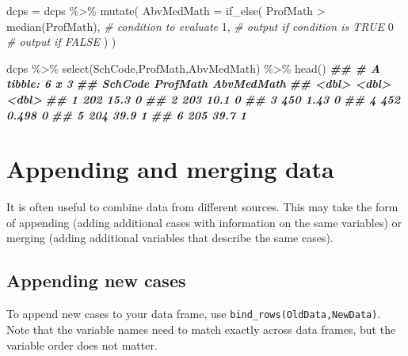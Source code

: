 \documentclass[
  12pt,
]{krantz}
\newenvironment{Shaded}{\begin{snugshade}}{\end{snugshade}}
\newcommand{\AttributeTok}[1]{\textcolor[rgb]{0.77,0.63,0.00}{#1}}
\newcommand{\CommentTok}[1]{\textcolor[rgb]{0.56,0.35,0.01}{\textit{#1}}}
\newcommand{\DecValTok}[1]{\textcolor[rgb]{0.00,0.00,0.81}{#1}}
\newcommand{\DocumentationTok}[1]{\textcolor[rgb]{0.56,0.35,0.01}{\textbf{\textit{#1}}}}
\newcommand{\FunctionTok}[1]{\textcolor[rgb]{0.00,0.00,0.00}{#1}}
\newcommand{\NormalTok}[1]{#1}
\newcommand{\OtherTok}[1]{\textcolor[rgb]{0.56,0.35,0.01}{#1}}
\newcommand{\SpecialCharTok}[1]{\textcolor[rgb]{0.00,0.00,0.00}{#1}}
\begin{document}
\begin{Shaded}
\begin{Highlighting}[]
\NormalTok{  dcps }\OtherTok{=}
\NormalTok{    dcps }\SpecialCharTok{\%\textgreater{}\%}
    \FunctionTok{mutate}\NormalTok{(}
      \AttributeTok{AbvMedMath =} \FunctionTok{if\_else}\NormalTok{(}
\NormalTok{        ProfMath }\SpecialCharTok{\textgreater{}} \FunctionTok{median}\NormalTok{(ProfMath), }\CommentTok{\# condition to evaluate}
        \DecValTok{1}\NormalTok{,  }\CommentTok{\# output if condition is TRUE}
        \DecValTok{0}   \CommentTok{\# output if FALSE}
\NormalTok{      )}
\NormalTok{    )}

\NormalTok{  dcps }\SpecialCharTok{\%\textgreater{}\%} \FunctionTok{select}\NormalTok{(SchCode,ProfMath,AbvMedMath) }\SpecialCharTok{\%\textgreater{}\%} \FunctionTok{head}\NormalTok{()}
\DocumentationTok{\#\# \# A tibble: 6 x 3}
\DocumentationTok{\#\#   SchCode ProfMath AbvMedMath}
\DocumentationTok{\#\#     \textless{}dbl\textgreater{}    \textless{}dbl\textgreater{}      \textless{}dbl\textgreater{}}
\DocumentationTok{\#\# 1     202   15.3            0}
\DocumentationTok{\#\# 2     203   10.1            0}
\DocumentationTok{\#\# 3     450    1.43           0}
\DocumentationTok{\#\# 4     452    0.498          0}
\DocumentationTok{\#\# 5     204   39.9            1}
\DocumentationTok{\#\# 6     205   39.7            1}
\end{Highlighting}
\end{Shaded}

\hypertarget{appending-and-merging-data}{%
\section{Appending and merging data}\label{appending-and-merging-data}}

It is often useful to combine data from different sources. This may take the form of appending (adding additional cases with information on the same variables) or merging (adding additional variables that describe the same cases).

\hypertarget{appending-new-cases}{%
\subsection{Appending new cases}\label{appending-new-cases}}

To append new cases to your data frame, use \texttt{bind\_rows(OldData,NewData)}. Note that the variable names need to match exactly across data frames, but the variable order does not matter.
\end{document}
